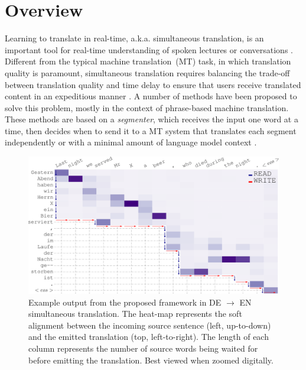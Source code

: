 \section{Overview}
Learning to translate in real-time, a.k.a. simultaneous translation, is an important tool for real-time understanding of spoken lectures or conversations \cite{fugen2007simultaneous,bangalore2012real}.
Different from the typical machine translation~(MT) task, in which translation quality is paramount, simultaneous translation requires balancing the trade-off between translation quality and time delay to ensure that users receive translated content in an expeditious manner \cite{mieno2015speed}.
A number of methods have been proposed to solve this problem, mostly in the context of phrase-based machine translation.
These methods are based on a \textit{segmenter}, which receives the input one word at a time, then decides when to send it to a MT system that translates each segment independently \cite{oda-EtAl:2014:P14-2} or with a minimal amount of language model context \cite{bangalore2012real}.
\begin{figure}[!t]
   	\centering
          	\includegraphics[width=0.9\linewidth]{figs/simultrans/cropped_kkkk.pdf} 
          	\caption{\label{cp9.fig.crop} {Example output from the proposed framework in DE $\rightarrow$ EN simultaneous translation. The heat-map represents the soft alignment between the incoming source sentence (left, up-to-down) and the emitted translation (top, left-to-right). The length of each column represents the number of source words being waited for before emitting the translation. Best viewed when zoomed digitally.}}
\end{figure} 

